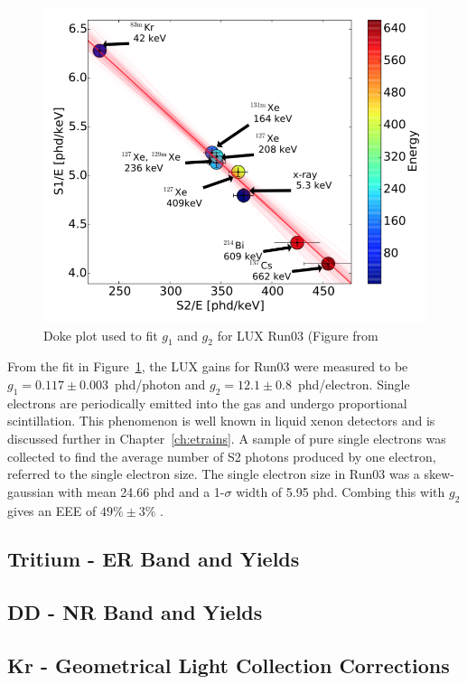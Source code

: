 \begin{figure}[htbp]
\begin{center}
\includegraphics[width=\halffig]{figures/lux/doke.png}
\caption{ Doke plot used to fit $g_{1}$ and $g_{2}$ for LUX Run03 (Figure from \cite{LUX:Run03Comprehensive}}
\label{fig:doke}
\end{center}
\end{figure}

From the fit in Figure~\ref{fig:doke}, the \ac{LUX} gains for Run03 were measured to be $g_{1} = 0.117 \pm 0.003$~phd/photon and $g_{2} = 12.1 \pm 0.8$~phd/electron. Single electrons are periodically emitted into the gas and undergo proportional scintillation. This phenomenon is well known in liquid xenon detectors and is discussed further in Chapter~\ref{ch:etrains}. A sample of pure single electrons was collected to find the average number of S2 photons produced by one electron, referred to the single electron size. The single electron size in Run03 was a skew-gaussian with mean 24.66 phd and a 1-$\sigma$ width of 5.95 phd. Combing this with $g_{2}$ gives an \ac{EEE} of $49\% \pm 3\%$ \cite{LUX:Run03Comprehensive}.


\subsection{Tritium - ER Band and Yields}


\subsection{DD - NR Band and Yields}


\subsection{Kr - Geometrical Light Collection Corrections}
\label{sec:krypton}




